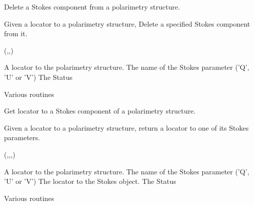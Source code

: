 \begin{manroutinedescription}
     Delete a Stokes component from a polarimetry structure.

     Given a locator to a polarimetry structure, Delete a specified Stokes
     component from it.

     {}

     {} {} ({},{},{})

\begin{manparametertable}
 A locator %
to the polarimetry
                       structure.
 The name %
of the
                       Stokes parameter ('Q', 'U' or 'V')
 The Status

\end{manparametertable}
     Various {} routines
\end{manroutinedescription}
\begin{manroutinedescription}
     Get locator to a Stokes component of a polarimetry structure.

     Given a locator to a polarimetry structure, return a locator
     to one of its Stokes parameters.

     {}

     {} {} ({},{},{},{})

\begin{manparametertable}
 A locator %
to the polarimetry
                       structure.
 The name %
of the
                       Stokes parameter ('Q', 'U' or 'V')
 The %
locator to the
                       Stokes {} object.
 The Status

\end{manparametertable}
     Various {} routines
\end{manroutinedescription}
